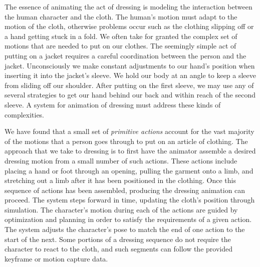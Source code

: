 

The essence of animating the act of dressing is modeling the
interaction between the human character and the cloth.  The human's motion
must adapt to the motion of the cloth, otherwise problems occur such as the
clothing slipping off or a hand getting stuck in a fold.  We often take
for granted the complex set of motions that are needed to put on our
clothes.  The seemingly simple act of putting on a jacket requires a
careful coordination between the person and the jacket.  Unconsciously we
make constant adjustments to our hand’s position when inserting it into
the jacket’s sleeve.  We hold our body at an angle to keep a sleeve from
sliding off our shoulder.  After putting on the first sleeve, we may use
any of several strategies to get our hand behind our back and within reach
of the second sleeve.  A system for animation of dressing must address
these kinds of complexities.

We have found that a small set of \emph{primitive actions} account for the vast
majority of the motions that a person goes through to put on an article of
clothing.  The approach that we take to dressing is to first have the
animator assemble a desired dressing motion from a small number of such
actions.  These actions include placing a hand or foot through an opening,
pulling the garment onto a limb, and stretching out a limb after it has
been positioned in the clothing.  Once this sequence of actions has been
assembled, producing the dressing animation can proceed.  The system steps
forward in time, updating the cloth's position through simulation.  The
character's motion during each of the actions are guided by optimization
and planning in order to satisfy the requirements of a given
action. The system adjusts the character's pose to match the end of one
action to the start of the next. Some portions of a dressing sequence do
not require the character to react to the cloth, and such segments can follow
the provided keyframe or motion capture data.

